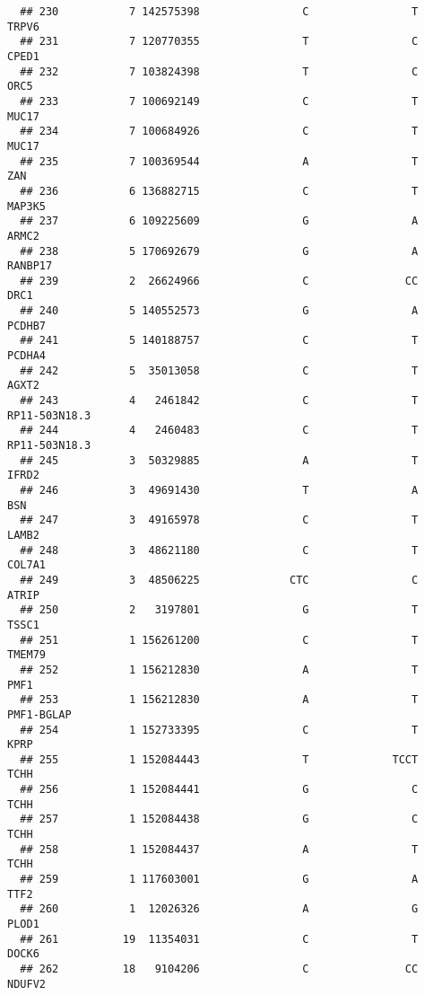 \documentclass[12pt,twoside]{reedthesis}
\theoremstyle{definition}
\theoremstyle{definition}
\theoremstyle{remark}
\begin{document}
\begin{verbatim}
  ## 230           7 142575398                C                T          TRPV6
  ## 231           7 120770355                T                C          CPED1
  ## 232           7 103824398                T                C           ORC5
  ## 233           7 100692149                C                T          MUC17
  ## 234           7 100684926                C                T          MUC17
  ## 235           7 100369544                A                T            ZAN
  ## 236           6 136882715                C                T         MAP3K5
  ## 237           6 109225609                G                A          ARMC2
  ## 238           5 170692679                G                A        RANBP17
  ## 239           2  26624966                C               CC           DRC1
  ## 240           5 140552573                G                A         PCDHB7
  ## 241           5 140188757                C                T         PCDHA4
  ## 242           5  35013058                C                T          AGXT2
  ## 243           4   2461842                C                T  RP11-503N18.3
  ## 244           4   2460483                C                T  RP11-503N18.3
  ## 245           3  50329885                A                T          IFRD2
  ## 246           3  49691430                T                A            BSN
  ## 247           3  49165978                C                T          LAMB2
  ## 248           3  48621180                C                T         COL7A1
  ## 249           3  48506225              CTC                C          ATRIP
  ## 250           2   3197801                G                T          TSSC1
  ## 251           1 156261200                C                T         TMEM79
  ## 252           1 156212830                A                T           PMF1
  ## 253           1 156212830                A                T     PMF1-BGLAP
  ## 254           1 152733395                C                T           KPRP
  ## 255           1 152084443                T             TCCT           TCHH
  ## 256           1 152084441                G                C           TCHH
  ## 257           1 152084438                G                C           TCHH
  ## 258           1 152084437                A                T           TCHH
  ## 259           1 117603001                G                A           TTF2
  ## 260           1  12026326                A                G          PLOD1
  ## 261          19  11354031                C                T          DOCK6
  ## 262          18   9104206                C               CC         NDUFV2

\end{verbatim}
\end{document}

